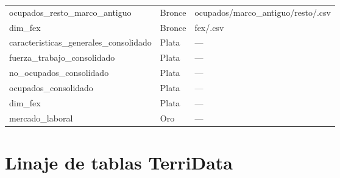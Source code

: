 \begin{longtable}{
        >{\raggedright\arraybackslash\ttfamily\footnotesize}p{6.0cm}
        >{\centering\arraybackslash}p{1.4cm}
        >{\raggedright\arraybackslash\ttfamily\footnotesize}p{5.6cm}
    }
    ocupados\_\allowbreak resto\_\allowbreak marco\_\allowbreak antiguo & Bronce &
        ocupados/\allowbreak marco\_\allowbreak antiguo/\allowbreak resto/\allowbreak *.csv \\
    dim\_\allowbreak fex & Bronce & fex/\allowbreak *.csv \\
    \addlinespace
    caracteristicas\_\allowbreak generales\_\allowbreak consolidado & Plata & --- \\
    fuerza\_\allowbreak trabajo\_\allowbreak consolidado & Plata & --- \\
    no\_\allowbreak ocupados\_\allowbreak consolidado & Plata & --- \\
    ocupados\_\allowbreak consolidado & Plata & --- \\
    dim\_\allowbreak fex & Plata & --- \\
    \addlinespace
    mercado\_\allowbreak laboral & Oro & --- \\
    \end{longtable}

\section{Linaje de tablas TerriData}
\label{sec:apendice-linaje-terridata}

